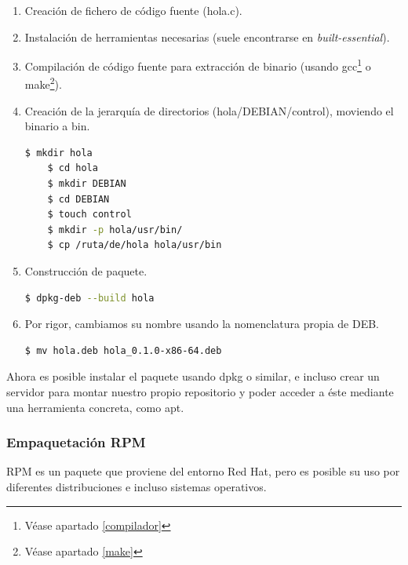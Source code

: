 \documentclass[a4paper, 11pt, titlepage]{article}
\begin{document}
            \begin{enumerate}
                \item Creación de fichero de código fuente (hola.c).
                \item Instalación de herramientas necesarias (suele encontrarse en \textit{built-essential}).
                \item Compilación de código fuente para extracción de binario (usando gcc\footnote{Véase apartado 
                \ref{compilador}} o make\footnote{Véase apartado \ref{make}}).
                \item Creación de la jerarquía de directorios (hola/DEBIAN/control), moviendo el binario a bin.
                
                \begin{lstlisting}[language=bash]
    $ mkdir hola
    $ cd hola
    $ mkdir DEBIAN
    $ cd DEBIAN
    $ touch control
    $ mkdir -p hola/usr/bin/
    $ cp /ruta/de/hola hola/usr/bin\end{lstlisting}

                \item Construcción de paquete.
                
                \begin{lstlisting}[language=bash]
    $ dpkg-deb --build hola\end{lstlisting}
                
                \item Por rigor, cambiamos su nombre usando la nomenclatura propia de DEB.
                
                \begin{lstlisting}[language=bash]
    $ mv hola.deb hola_0.1.0-x86-64.deb\end{lstlisting}

            \end{enumerate}

            Ahora es posible instalar el paquete usando dpkg o similar, e incluso crear un servidor para 
            montar nuestro propio repositorio y poder acceder a éste mediante una herramienta concreta, como 
            apt.

        \subsubsection{Empaquetación RPM}

            RPM es un paquete que proviene del entorno Red Hat, pero es posible su uso por 
            diferentes distribuciones e incluso sistemas operativos.
\end{document}
